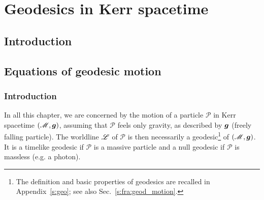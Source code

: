 \chapter{Geodesics in Kerr spacetime}
\label{s:gek}

\minitoc

\section{Introduction}

\section{Equations of geodesic motion}

\subsection{Introduction}

In all this chapter, we are concerned by the motion of a particle
$\mathscr{P}$ in Kerr spacetime $(\mathscr{M},\bm{g})$, assuming that $\mathscr{P}$
feels only gravity, as described by $\bm{g}$ (freely falling particle).
The worldline $\mathscr{L}$ of $\mathscr{P}$
is then necessarily a geodesic\footnote{The definition and basic properties of geodesics
are recalled in Appendix~\ref{s:geo}; see also Sec.~\ref{s:fra:geod_motion}.} of
$(\mathscr{M},\bm{g})$. It is a timelike geodesic if $\mathscr{P}$ is a massive particle
and a null geodesic if $\mathscr{P}$ is massless (e.g. a photon).

